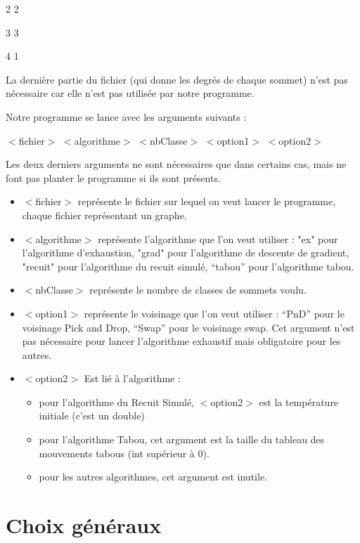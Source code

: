 \documentclass[12pt]{article}
\begin{document}
2 2

3 3

4 1

La dernière partie du fichier (qui donne les degrés de chaque sommet) n’est pas nécessaire car elle n’est pas utilisée par notre programme.
\bigskip

Notre programme se lance avec les arguments suivants :

   $<$fichier$>$ $<$algorithme$>$ $<$nbClasse$>$ $<$option1$>$ $<$option2$>$

\bigskip
   Les deux derniers arguments ne sont nécessaires que dans certains cas, mais ne font pas planter le programme si ils sont présents.

	\begin{itemize}
   \item $<$fichier$>$ représente le fichier sur lequel on veut lancer le programme, chaque fichier représentant un graphe.

  \item  $<$algorithme$>$ représente l'algorithme que l'on veut utiliser : "ex" pour l'algorithme d'exhaustion, "grad" pour l'algorithme de descente de gradient, "recuit" pour l'algorithme du recuit simulé, “tabou” pour l’algorithme tabou.

   \item $<$nbClasse$>$ représente le nombre de classes de sommets voulu.

   \item $<$option1$>$ représente le voisinage que l’on veut utiliser : “PnD” pour le voisinage Pick and Drop, “Swap” pour le voisinage swap. Cet argument n’est pas nécessaire pour lancer l’algorithme exhaustif mais obligatoire pour les autres.

   \item $<$option2$>$ Est lié à l’algorithme :
		\begin{itemize}
		\item pour l’algorithme du Recuit Simulé, $<$option2$>$ est la température initiale (c’est un double)
		\item pour l’algorithme Tabou, cet argument est la taille du tableau des mouvements tabous (int supérieur à 0).
    	\item pour les autres algorithmes, cet argument est inutile.
    	\end{itemize}
	\end{itemize}
	
\newpage	
	
\part{Choix généraux}
\end{document}
